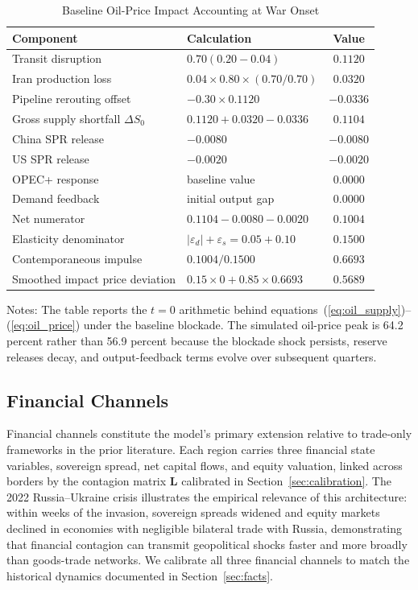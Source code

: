\documentclass[12pt]{article}
\begin{document}
\begin{table}[H]
\centering
\small
\begin{threeparttable}
\caption{Baseline Oil-Price Impact Accounting at War Onset}
\label{tab:oil_accounting}
\begin{tabular}{@{}llc@{}}
\toprule
Component & Calculation & Value \\
\midrule
Transit disruption & $0.70(0.20-0.04)$ & $0.1120$ \\
Iran production loss & $0.04\times0.80\times(0.70/0.70)$ & $0.0320$ \\
Pipeline rerouting offset & $-0.30\times0.1120$ & $-0.0336$ \\
Gross supply shortfall $\Delta S_0$ & $0.1120+0.0320-0.0336$ & $0.1104$ \\
China SPR release & $-0.0080$ & $-0.0080$ \\
US SPR release & $-0.0020$ & $-0.0020$ \\
OPEC+ response & baseline value & $0.0000$ \\
Demand feedback & initial output gap & $0.0000$ \\
\addlinespace
Net numerator & $0.1104-0.0080-0.0020$ & $0.1004$ \\
Elasticity denominator & $|\varepsilon_d|+\varepsilon_s=0.05+0.10$ & $0.1500$ \\
Contemporaneous impulse & $0.1004/0.1500$ & $0.6693$ \\
Smoothed impact price deviation & $0.15\times0+0.85\times0.6693$ & $0.5689$ \\
\bottomrule
\end{tabular}
\begin{tablenotes}[flushleft]
\small
\item Notes: The table reports the $t=0$ arithmetic behind equations~(\ref{eq:oil_supply})--(\ref{eq:oil_price}) under the baseline blockade. The simulated oil-price peak is 64.2 percent rather than 56.9 percent because the blockade shock persists, reserve releases decay, and output-feedback terms evolve over subsequent quarters.
\end{tablenotes}
\end{threeparttable}
\end{table}

\subsection{Financial Channels}

Financial channels constitute the model's primary extension relative to trade-only frameworks in the prior literature. Each region carries three financial state variables, sovereign spread, net capital flows, and equity valuation, linked across borders by the contagion matrix $\mathbf{L}$ calibrated in Section~\ref{sec:calibration}. The 2022 Russia--Ukraine crisis illustrates the empirical relevance of this architecture: within weeks of the invasion, sovereign spreads widened and equity markets declined in economies with negligible bilateral trade with Russia, demonstrating that financial contagion can transmit geopolitical shocks faster and more broadly than goods-trade networks. We calibrate all three financial channels to match the historical dynamics documented in Section~\ref{sec:facts}.
\end{document}
